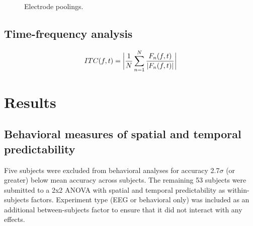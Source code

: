 \documentclass[dwyatte_dissertation.tex]{subfiles}
\begin{document}
\begin{figure}[h!]
\begin{tabular}{ll}
\end{tabular}
\caption{Electrode poolings.}{}
\label{fig:channels}
\end{figure}

\subsection{Time-frequency analysis}

\begin{align*}
ITC(f,t) = \bigg{|}\frac{1}{N} \sum_{n=1}^{N}{\frac{F_n(f,t)}{|F_n(f,t)|}}\bigg{|}
\end{align*}

\section{Results}

\subsection{Behavioral measures of spatial and temporal predictability}

Five subjects were excluded from behavioral analyses for accuracy 2.7$\sigma$ (or greater) below mean accuracy across subjects. The remaining 53 subjects were submitted to a 2x2 ANOVA with spatial and temporal predictability as within-subjects factors. Experiment type (EEG or behavioral only) was included as an additional between-subjects factor to ensure that it did not interact with any effects.





\end{document}
